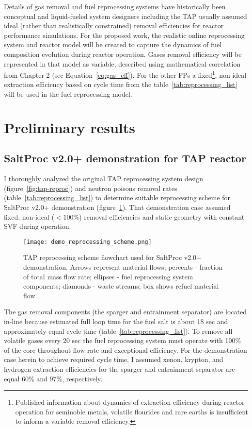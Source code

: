 Details of gas removal and fuel reprocessing systems have historically 
been conceptual and liquid-fueled system designers including the \gls{TAP} 
usually assumed ideal (rather than realistically constrained) removal 
efficiencies for reactor performance simulations. For the  proposed work, the 
realistic online reprocessing system and reactor model will be created to 
capture the dynamics of fuel composition evolution during reactor operation. 
Gases removal efficiency will be represented in that model as variable, 
described using mathematical correlation from Chapter 2 
(see Equation~\ref{eq:gas_eff}). For the other \glspl{FP} a  
fixed\footnote{Published information about dynamics of extraction efficiency 
during reactor operation for seminoble metals, volatile flourides and rare 
earths is insufficient to inform a variable removal efficiency.}, non-ideal 
extraction efficiency based on cycle time from the  
table~\ref{tab:reprocessing_list} will be used in the fuel reprocessing model.

\section{Preliminary results}
\subsection{SaltProc v2.0+ demonstration for TAP reactor}
I thoroughly analyzed the original \gls{TAP} reprocessing system design 
(figure~\ref{fig:tap-reproc}) and neutron poisons removal rates  
(table~\ref{tab:reprocessing_list}) to determine suitable reprocessing 
scheme for SaltProc v2.0+ demonstration (figure~\ref{fig:demo-repro-scheme}). 
That demonstration case assumed fixed, non-ideal ($<100$\%) removal 
efficiencies and static geometry with constant \gls{SVF} during operation.
\begin{figure}[htp!] %
	\centering
	\texttt{[image: demo\_reprocessing\_scheme.png]}
	\caption{\gls{TAP} reprocessing scheme flowchart used for SaltProc v2.0+ 
		demonstration. Arrows represent material flows; percents - fraction of 
		total mass flow rate; ellipses - fuel reprocessing system components; 
		diamonds - waste streams; box shows refuel material flow.}
	\label{fig:demo-repro-scheme}
\end{figure}

The gas removal components (the sparger and entrainment separator) are located 
in-line because estimated full loop time for the fuel salt is about 
18 sec and approximately equal cycle time (table~\ref{tab:reprocessing_list}). 
To remove all volatile gases every 20 sec the fuel reprocessing system must 
operate with 100\% of the core throughout flow rate and exceptional 
efficiency. For the demonstration case herein to achieve required cycle time, 
I assumed xenon, krypton, and hydrogen extraction efficiencies for the sparger 
and entrainment separator are equal 60\% and 97\%, respectively.


